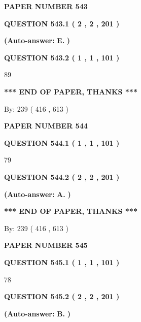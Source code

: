 \documentclass{ctexart}
\begin{document}
   
 {\textbf{ \Large{ PAPER NUMBER  543  }}}
   
   
   
   
  
  
{\textbf{\large{QUESTION
543.1 
 ( 2 , 2 , 201 )
}}}
 
 
{\textbf{(Auto-answer:}}
{\textbf{\large{
E.}}}
{\textbf{)}}
 
 
  
  
{\textbf{\large{QUESTION
543.2 
 ( 1 , 1 , 101 )
}}}

89
   
   
   
   
\vspace{1.0in} 
{\textbf{\large{ *** END OF PAPER, THANKS *** }}} 
   
   
\hspace{1.0in} By: 
 239 ( 416 ,  613 )
   
   
   
   
\newpage 
\setcounter{page}{ 
   544001 } 
   
   
 {\textbf{ \Large{ PAPER NUMBER  544  }}}
   
   
   
   
  
  
{\textbf{\large{QUESTION
544.1 
 ( 1 , 1 , 101 )
}}}

79
  
  
{\textbf{\large{QUESTION
544.2 
 ( 2 , 2 , 201 )
}}}
 
 
{\textbf{(Auto-answer:}}
{\textbf{\large{
A.}}}
{\textbf{)}}
 
 
   
   
   
   
\vspace{1.0in} 
{\textbf{\large{ *** END OF PAPER, THANKS *** }}} 
   
   
\hspace{1.0in} By: 
 239 ( 416 ,  613 )
   
   
   
   
\newpage 
\setcounter{page}{ 
   545001 } 
   
   
 {\textbf{ \Large{ PAPER NUMBER  545  }}}
   
   
   
   
  
  
{\textbf{\large{QUESTION
545.1 
 ( 1 , 1 , 101 )
}}}

78
  
  
{\textbf{\large{QUESTION
545.2 
 ( 2 , 2 , 201 )
}}}
 
 
{\textbf{(Auto-answer:}}
{\textbf{\large{
B.}}}
{\textbf{)}}
 
\end{document}
